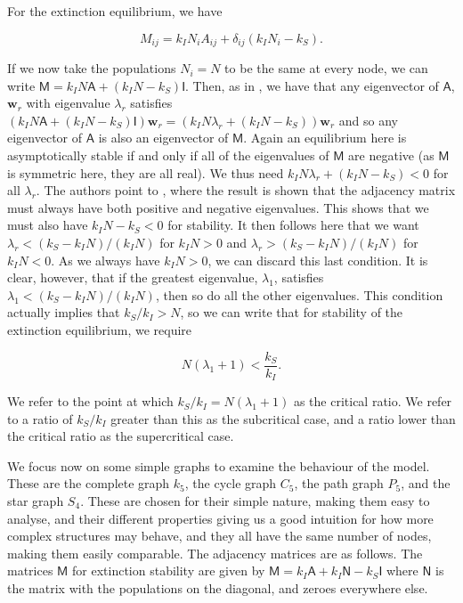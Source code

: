\documentclass[12pt,a4paper,openany,twoside]{book}
\renewcommand{\v}[1]{\mathbf{#1}}      %
\newcommand{\m}[1]{\bm{\mathsf{#1}}}	 %
\begin{document}
For the extinction equilibrium, we have

\begin{equation}
	M_{ij} = k_I N_i A_{ij} + \delta_{ij} (k_I N_i - k_S).
\end{equation}

If we now take the populations $N_i = N$ to be the same at every node, we can write $\m M = k_I N \m A + (k_I N - k_S) \m I$. Then, as in \citet{porterDynamicalSystemsNetworks2015}, we have that any eigenvector of $\m A$, $\v w_r$ with eigenvalue $\lambda_r$ satisfies $(k_I N \m A + (k_I N - k_S) \m I) \v w_r = (k_I N \lambda_r + (k_I N - k_S)) \v w_r$ and so any eigenvector of $\m A$ is also an eigenvector of $\m M$. Again an equilibrium here is asymptotically stable if and only if all of the eigenvalues of $\m M$ are negative (as $\m M$ is symmetric here, they are all real). We thus need $k_I N \lambda_r + (k_I N - k_S) < 0$ for all $\lambda_r$. The authors point to \citet{newmanDynamicalSystemsNetworks2018}, where the result is shown that the adjacency matrix must always have both positive and negative eigenvalues. This shows that we must also have $k_I N - k_S < 0$ for stability. It then follows here that we want $\lambda_r < (k_S - k_I N)/(k_I N)$ for $k_I N > 0$ and $\lambda_r > (k_S - k_I N)/(k_I N)$ for $k_I N < 0$. As we always have $k_I N > 0$, we can discard this last condition. It is clear, however, that if the greatest eigenvalue, $\lambda_1$, satisfies $\lambda_1 < (k_S - k_I N) / (k_I N)$, then so do all the other eigenvalues. This condition actually implies that $k_S / k_I > N$, so we can write that for stability of the extinction equilibrium, we require

\begin{equation}
	N (\lambda_1 + 1) < \frac {k_S} {k_I}.
\end{equation}

We refer to the point at which $k_S / k_I = N (\lambda_1 + 1)$ as the critical ratio. We refer to a ratio of $k_S / k_I$ greater than this as the subcritical case, and a ratio lower than the critical ratio as the supercritical case.

We focus now on some simple graphs to examine the behaviour of the model. These are the complete graph $k_5$, the cycle graph $C_5$, the path graph $P_5$, and the star graph $S_4$. These are chosen for their simple nature, making them easy to analyse, and their different properties giving us a good intuition for how more complex structures may behave, and they all have the same number of nodes, making them easily comparable. The adjacency matrices are as follows. The matrices $\m M$ for extinction stability are given by $\m M = k_I \m A + k_I \m N - k_S \m I$ where $\m N$ is the matrix with the populations on the diagonal, and zeroes everywhere else. 
\end{document}
